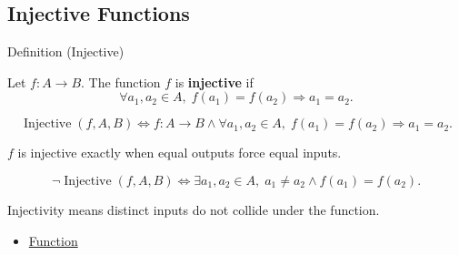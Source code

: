 \subsection*{Injective Functions}
\label{subsec:injective-functions}

\begin{definitionbox}{Definition (Injective)}
\begin{definition}
\label{def:alg-injective}
Let $f:A\to B$.
The function $f$ is \textbf{injective} if
\[
\forall a_1,a_2 \in A,\;
f(a_1)=f(a_2) \Rightarrow a_1=a_2.
\]
\end{definition}
\end{definitionbox}

\begin{remark*}
\[
\operatorname{Injective}(f,A,B)
\Longleftrightarrow
f:A\to B
\land
\forall a_1,a_2\in A,\; f(a_1)=f(a_2)\Rightarrow a_1=a_2.
\]
\end{remark*}

\begin{remark*}
$f$ is injective exactly when equal outputs force equal inputs.
\end{remark*}

\begin{remark*}
\[
\neg\operatorname{Injective}(f,A,B)
\Longleftrightarrow
\exists a_1,a_2\in A,\;
a_1\neq a_2 \land f(a_1)=f(a_2).
\]
\end{remark*}

\begin{remark*}[Interpretation]
Injectivity means distinct inputs do not collide under the function.
\end{remark*}

\begin{dependencies}
\begin{itemize}
  \item \hyperref[def:alg-function]{Function}
\end{itemize}
\end{dependencies}
